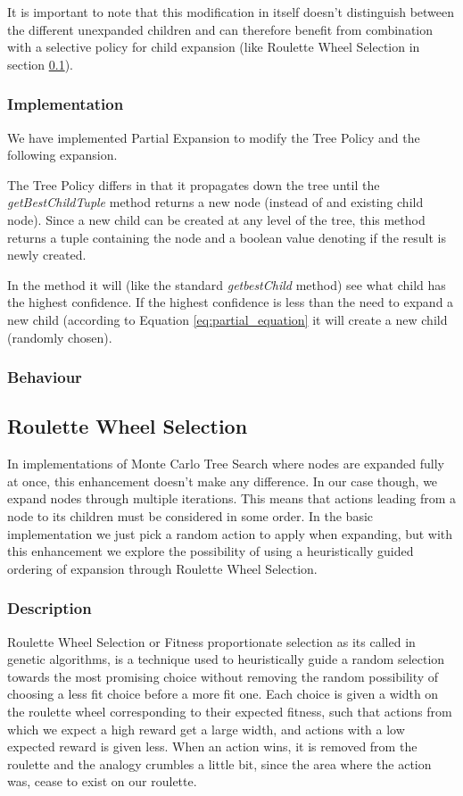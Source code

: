 \documentclass[10pt,a4paper]{article}
\begin{document}
It is important to note that this modification in itself doesn't distinguish between the different unexpanded children and can therefore benefit from combination with a selective policy for child expansion (like Roulette Wheel Selection in section \ref{roulette}).

\subsubsection*{Implementation}
We have implemented Partial Expansion to modify the Tree Policy and the following expansion.

The Tree Policy differs in that it propagates down the tree until the \emph{getBestChildTuple} method returns a new node (instead of and existing child node). Since a new child can be created at any level of the tree, this method returns a tuple containing the node and a boolean value denoting if the result is newly created.

In the method it will (like the standard \emph{getbestChild} method) see what child has the highest confidence. If the highest confidence is less than the need to expand a new child (according to Equation \ref{eq:partial_equation} it will create a new child (randomly chosen).
\subsubsection*{Behaviour}
\subsection{Roulette Wheel Selection}
\label{roulette}
In implementations of Monte Carlo Tree Search where nodes are expanded fully at once, this enhancement doesn't make any difference. In our case though, we expand nodes through multiple iterations. This means that actions leading from a node to its children must be considered in some order. In the basic implementation we just pick a random action to apply when expanding, but with this enhancement we explore the possibility of using a heuristically guided ordering of expansion through Roulette Wheel Selection.

\subsubsection*{Description}
Roulette Wheel Selection or Fitness proportionate selection as its called in genetic algorithms, is a technique used to heuristically guide a random selection towards the most promising choice without removing the random possibility of choosing a less fit choice before a more fit one. Each choice is given a width on the roulette wheel corresponding to their expected fitness, such that actions from which we expect a high reward get a large width, and actions with a low expected reward is given less.
When an action wins, it is removed from the roulette and the analogy crumbles a little bit, since the area where the action was, cease to exist on our roulette.
\end{document}
